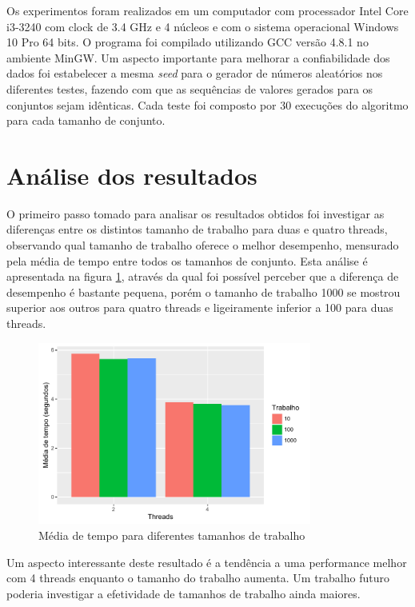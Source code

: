 \documentclass[12pt]{article}
\begin{document}
Os experimentos foram realizados em um computador com processador Intel Core i3-3240 com clock de 3.4 GHz e 4 núcleos e com o sistema operacional Windows 10 Pro 64 bits. O programa foi compilado utilizando GCC versão 4.8.1 no ambiente MinGW. Um aspecto importante para melhorar a confiabilidade dos dados foi estabelecer a mesma \textit{seed} para o gerador de números aleatórios nos diferentes testes, fazendo com que as sequências de valores gerados para os conjuntos sejam idênticas. Cada teste foi composto por 30 execuções do algoritmo para cada tamanho de conjunto.

\section{Análise dos resultados} \label{sec:results}

O primeiro passo tomado para analisar os resultados obtidos foi investigar as diferenças entre os distintos tamanho de trabalho para duas e quatro threads, observando qual tamanho de trabalho oferece o melhor desempenho, mensurado pela média de tempo entre todos os tamanhos de conjunto. Esta análise é apresentada na figura \ref{fig:chunks}, através da qual foi possível perceber que a diferença de desempenho é bastante pequena, porém o tamanho de trabalho 1000 se mostrou superior aos outros para quatro threads e ligeiramente inferior a 100 para duas threads.

\begin{figure}[ht]
    \centering
    \includegraphics[width=9cm]{chunks}
    \caption{Média de tempo para diferentes tamanhos de trabalho}
    \label{fig:chunks}
\end{figure}

Um aspecto interessante deste resultado é a tendência a uma performance melhor com 4 threads enquanto o tamanho do trabalho aumenta. Um trabalho futuro poderia investigar a efetividade de tamanhos de trabalho ainda maiores.
\end{document}
